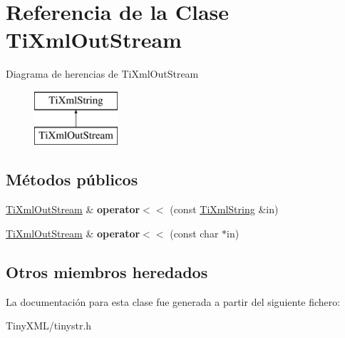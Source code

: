 \hypertarget{class_ti_xml_out_stream}{\section{Referencia de la Clase Ti\-Xml\-Out\-Stream}
\label{class_ti_xml_out_stream}
}
Diagrama de herencias de Ti\-Xml\-Out\-Stream\begin{figure}[H]
\begin{center}
\leavevmode
\includegraphics[height=2.000000cm]{class_ti_xml_out_stream}
\end{center}
\end{figure}
\subsection*{Métodos públicos}
\begin{DoxyCompactItemize}
\item 
\hypertarget{class_ti_xml_out_stream_a3640dcb1c0903be3bc6966cdc9a79db6}{\hyperlink{class_ti_xml_out_stream}{Ti\-Xml\-Out\-Stream} \& {\bfseries operator$<$$<$} (const \hyperlink{class_ti_xml_string}{Ti\-Xml\-String} \&in)}\label{class_ti_xml_out_stream_a3640dcb1c0903be3bc6966cdc9a79db6}

\item 
\hypertarget{class_ti_xml_out_stream_af2117e5a8cbfcb69544804ad2859bfb6}{\hyperlink{class_ti_xml_out_stream}{Ti\-Xml\-Out\-Stream} \& {\bfseries operator$<$$<$} (const char $\ast$in)}\label{class_ti_xml_out_stream_af2117e5a8cbfcb69544804ad2859bfb6}

\end{DoxyCompactItemize}
\subsection*{Otros miembros heredados}


La documentación para esta clase fue generada a partir del siguiente fichero\-:\begin{DoxyCompactItemize}
\item 
Tiny\-X\-M\-L/tinystr.\-h\end{DoxyCompactItemize}
